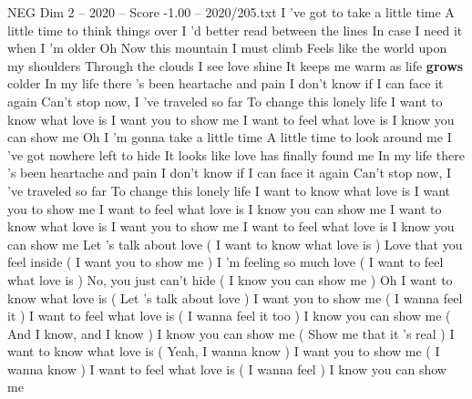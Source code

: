 \begin{textsample}{NEG Dim 2 – 2020 – Score -1.00 – 2020/205.txt}  \label{ex:f2_neg_030}
I 've got to take a little time A little time to think things over I 'd better read between the lines In case I need it when I 'm older Oh Now this mountain I must climb Feels like the world upon my shoulders Through the clouds I see love shine It keeps me warm as life \textbf{grows} colder In my life there 's been heartache and pain I don't know if I can face it again Can't stop now, I 've traveled so far To change this lonely life I want to know what love is I want you to show me I want to feel what love is I know you can show me Oh I 'm gonna take a little time A little time to look around me I 've got nowhere left to hide It looks like love has finally found me In my life there 's been heartache and pain I don't know if I can face it again Can't stop now, I 've traveled so far To change this lonely life I want to know what love is I want you to show me I want to feel what love is I know you can show me I want to know what love is I want you to show me I want to feel what love is I know you can show me Let 's talk about love ( I want to know what love is ) Love that you feel inside ( I want you to show me ) I 'm feeling so much love ( I want to feel what love is ) No, you just can't hide ( I know you can show me ) Oh I want to know what love is ( Let 's talk about love ) I want you to show me ( I wanna feel it ) I want to feel what love is ( I wanna feel it too ) I know you can show me ( And I know, and I know ) I know you can show me ( Show me that it 's real ) I want to know what love is ( Yeah, I wanna know ) I want you to show me ( I wanna know ) I want to feel what love is ( I wanna feel ) I know you can show me

\end{textsample}
